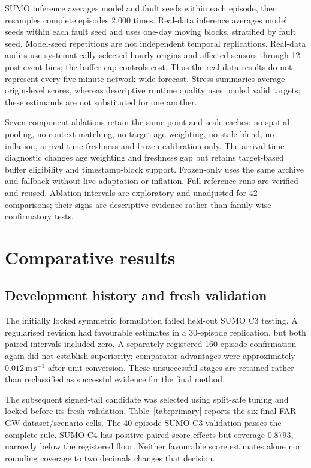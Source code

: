 \documentclass[pdflatex,sn-mathphys-num]{sn-jnl}
\newcommand{\ms}{\mathrm{m\,s^{-1}}}
\begin{document}
SUMO inference averages model and fault seeds within each episode, then resamples complete episodes 2,000 times. Real-data inference averages model seeds within each fault seed and uses one-day moving blocks, stratified by fault seed. Model-seed repetitions are not independent temporal replications. Real-data audits use systematically selected hourly origins and affected sensors through 12 post-event bins; the buffer cap controls cost. Thus the real-data results do not represent every five-minute network-wide forecast. Stress summaries average origin-level scores, whereas descriptive runtime quality uses pooled valid targets; these estimands are not substituted for one another.

Seven component ablations retain the same point and scale caches: no spatial pooling, no context matching, no target-age weighting, no stale blend, no inflation, arrival-time freshness and frozen calibration only. The arrival-time diagnostic changes age weighting and freshness gap but retains target-based buffer eligibility and timestamp-block support. Frozen-only uses the same archive and fallback without live adaptation or inflation. Full-reference runs are verified and reused. Ablation intervals are exploratory and unadjusted for 42 comparisons; their signs are descriptive evidence rather than family-wise confirmatory tests.


\section{Comparative results}\label{sec:results}

\subsection{Development history and fresh validation}
The initially locked symmetric formulation failed held-out SUMO C3 testing. A regularised revision had favourable estimates in a 30-episode replication, but both paired intervals included zero. A separately registered 160-episode confirmation again did not establish superiority; comparator advantages were approximately $0.012\,\ms$ after unit conversion. These unsuccessful stages are retained rather than reclassified as successful evidence for the final method.

The subsequent signed-tail candidate was selected using split-safe tuning and locked before its fresh validation. Table~\ref{tab:primary} reports the six final FAR-GW dataset/scenario cells. The 40-episode SUMO C3 validation passes the complete rule. SUMO C4 has positive paired score effects but coverage 0.8793, narrowly below the registered floor. Neither favourable score estimates alone nor rounding coverage to two decimals changes that decision.
\end{document}
